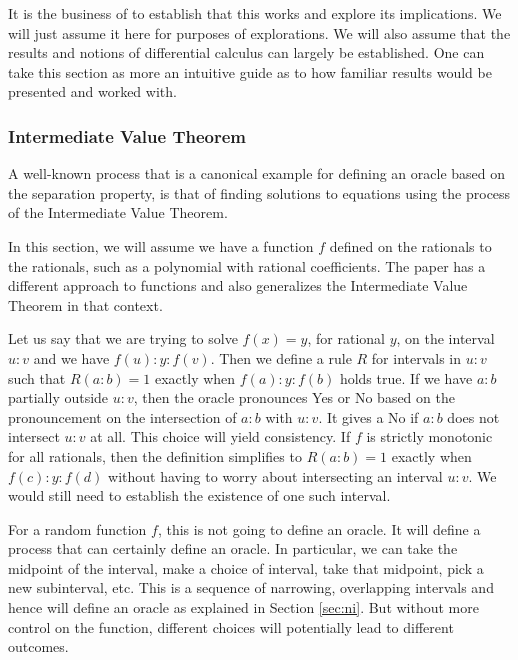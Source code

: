 \documentclass[12pt]{article}
\begin{document}
It is the business of \cite{taylor23funora} to establish that this works and explore its implications. We will just assume it here for purposes of explorations. We will also assume that the results and notions of differential calculus can largely be established.  One can take this section as more an intuitive guide as to how familiar results would be presented and worked with. 



\subsubsection{Intermediate Value Theorem}\label{sec:ivt}

A well-known process that is a canonical example for defining an oracle based on the separation property, is that of finding solutions to equations using the process of the Intermediate Value Theorem. 

In this section, we will assume we have a function $f$ defined on the rationals to the rationals, such as a polynomial with rational coefficients. The paper \cite{taylor23funora} has a different approach to functions and also generalizes the Intermediate Value Theorem in that context. 

Let us say that we are trying to solve $f(x) = y$, for rational $y$, on the interval $u:v$ and we have $f(u):y:f(v)$. Then we define a rule $R$ for intervals in $u:v$ such that $R(a:b) = 1$ exactly when $f(a):y:f(b)$ holds true. If we have $a:b$ partially outside $u:v$, then the oracle pronounces Yes or No based on the pronouncement on the intersection of $a:b$ with $u:v$. It gives a No if $a:b$ does not intersect $u:v$ at all. This choice will yield consistency. If $f$ is strictly monotonic for all rationals, then the definition simplifies to $R(a:b)=1$ exactly when $f(c):y:f(d)$ without having to worry about intersecting an interval $u:v$. We would still need to establish the existence of one such interval. 

For a random function $f$, this is not going to define an oracle. It will define a process that can certainly define an oracle. In particular, we can take the midpoint of the interval, make a choice of interval, take that midpoint, pick a new subinterval, etc. This is a sequence of narrowing, overlapping intervals and hence will define an oracle as explained in Section \ref{sec:ni}. But without more control on the function, different choices will potentially lead to different outcomes. 
\end{document}
